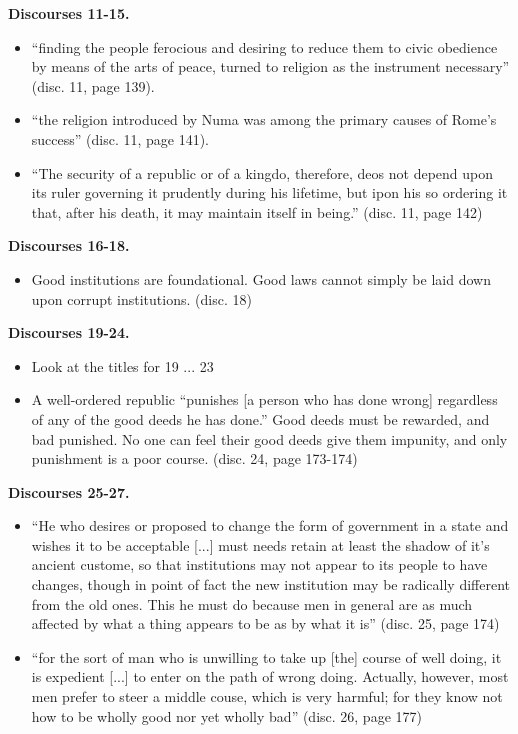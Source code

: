 \documentclass[11pt]{article}
\newcommand{\keyquote}[1]{{\color{BrickRed}#1}}
\newcommand{\discourses}[1]{{\bfseries Discourses #1.}}
\newcommand{\p}{page }
\renewcommand{\d}{disc. }
\begin{document}
\discourses{11-15}
\begin{itemize}
\item   
    ``finding the people ferocious and desiring to reduce them to
    civic obedience by means of the arts of peace, turned to
    religion as the instrument necessary'' (\d 11, \p 139).
\item
    ``the religion introduced by Numa was among the primary 
    causes of Rome's success'' (\d 11, \p 141).
\item
    \keyquote{
    ``The security of a republic or of a kingdo, therefore, deos 
    not depend upon its ruler governing it prudently during
    his lifetime, but ipon his so ordering it that, after his
    death, it may maintain itself in being.''} (\d 11, \p 142)
\end{itemize}

\discourses{16-18}
\begin{itemize}
\item
    Good institutions are foundational. Good laws cannot
    simply be laid down upon corrupt institutions. (\d 18)
\end{itemize}

\discourses{19-24}
\begin{itemize}
\item
    Look at the titles for 19 ... 23
\item 
    A well-ordered republic ``punishes [a person who has done 
    wrong] regardless of any of the good deeds he has done.''
    Good deeds must be rewarded, and bad punished. No one can
    feel their good deeds give them impunity, and only 
    punishment is a poor course. 
    (\d 24, \p 173-174)
\end{itemize}

\discourses{25-27}
\begin{itemize}
\item   
    ``He who desires or proposed to change the form of government
    in a state and wishes it to be acceptable [...] must needs retain
    at least the shadow of it's ancient custome, so
    that institutions may not appear to its people to have changes,
    though in point of fact the new institution may be radically 
    different from the old ones. This he must do because men in 
    general are as much affected by what a thing appears to be 
    as by what it is'' (\d 25, \p 174)
\item
    ``for the sort of man who is unwilling to take up [the] course of
    well doing, it is expedient [...] to enter on the path of wrong
    doing. Actually, however, most men prefer to steer a middle couse, 
    which is very harmful; for they know not how to be wholly good nor
    yet wholly bad'' (\d 26, \p 177)    
\end{itemize}
\end{document}

